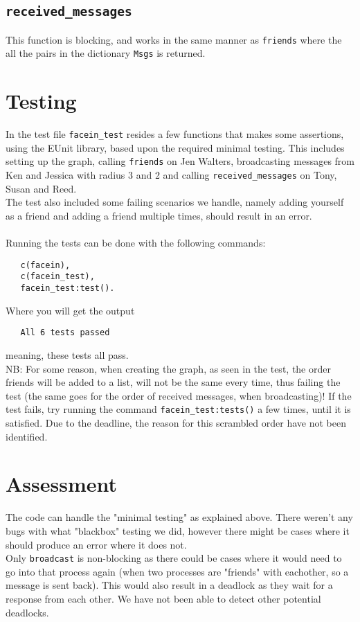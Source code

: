 \documentclass[a4paper]{article}
\begin{document}
\subsection*{\texttt{received\_messages}}
This function is blocking, and works in the same manner as \texttt{friends} where the all the pairs in the dictionary \texttt{Msgs} is returned.

\section*{Testing}
In the test file \texttt{facein\_test} resides a few functions that makes some assertions, using the EUnit library, based upon the required minimal testing. This includes setting up the graph, calling \texttt{friends} on Jen Walters, broadcasting messages from Ken and Jessica with radius 3 and 2 and calling \texttt{received\_messages} on Tony, Susan and Reed.\\
The test also included some failing scenarios we handle, namely adding yourself as a friend and adding a friend multiple times, should result in an error.\\ \\
Running the tests can be done with the following commands:
\begin{verbatim}
   c(facein),
   c(facein_test),
   facein_test:test().
\end{verbatim}
Where you will get the output
\begin{verbatim}
   All 6 tests passed
\end{verbatim}
meaning, these tests all pass.\\
NB: For some reason, when creating the graph, as seen in the test, the order friends will be added to a list, will not be the same every time, thus failing the test (the same goes for the order of received messages, when broadcasting)! If the test fails, try running the command \texttt{facein\_test:tests()} a few times, until it is satisfied. Due to the deadline, the reason for this scrambled order have not been identified.

\section*{Assessment}
The code can handle the "minimal testing" as explained above. There weren't any bugs with what "blackbox" testing we did, however there might be cases where it should produce an error where it does not. \\
Only \texttt{broadcast} is non-blocking as there could be cases where it would need to go into that process again (when two processes are "friends" with eachother, so a message is sent back). This would also result in a deadlock as they wait for a response from each other. We have not been able to detect other potential deadlocks.
\end{document}
